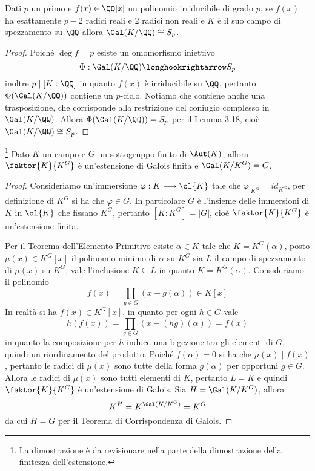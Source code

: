 \documentclass[11pt]{scrartcl}
\begin{document}
	\begin{lemma}
		\label{lemma3.19}
		Dati $p$ un primo e $f(x) \in \QQ[x]$ un polinomio irriducibile di grado
		$p$, se $f(x)$ ha esattamente $p - 2$ radici reali e 2 radici non reali
		e $K$ è il suo campo di spezzamento su $\QQ$ allora $\Gal(K/\QQ) \cong S_p$.
	\end{lemma}
	
	\begin{proof}
		Poiché $\deg f = p$ esiste un omomorfismo iniettivo 
		\[
		\Phi: \Gal(K/\QQ) \longhookrightarrow S_p
		\]
		inoltre $p \mid [K:\QQ]$ in quanto $f(x)$ è irriducibile su $\QQ$, pertanto 
		$\Phi(\Gal(K/\QQ))$ contiene un $p$-ciclo. Notiamo che contiene anche una
		trasposizione, che corrisponde alla restrizione del coniugio complesso 
		in $\Gal(K/\QQ)$. Allora $\Phi(\Gal(K/\QQ)) = S_p$ per il 
		\hyperref[lemma3.18]{Lemma 3.18}, cioè $\Gal(K/\QQ) \cong S_p$.
	\end{proof}
	
	\begin{lemma}
		\footnote{
			La dimostrazione è da revisionare nella parte della dimostrazione 
			della finitezza dell'estensione.
		}
		\label{lemma3.20}
		Dato $K$ un campo e $G$ un sottogruppo finito di $\Aut(K)$, allora 
		$\faktor{K}{K^G}$ è un'estensione di Galois finita e $\Gal(K/K^G) = G$.
	\end{lemma}
	
	\begin{proof}
		Consideriamo un'immersione $\varphi: K \longrightarrow \ol{K}$ tale che
		$\varphi_{\mid K^G} = id_{K^G}$, per definizione di $K^G$ si ha che 
		$\varphi \in G$. In particolare $G$ è l'insieme delle immersioni di $K$
		in $\ol{K}$ che fissano $K^G$, pertanto $[K:K^G] = |G|$, cioè $\faktor{K}{K^G}$
		è un'estensione finita. 
		
		Per il Teorema dell'Elemento Primitivo esiste $\alpha \in K$ tale che 
		$K = K^G(\alpha)$, posto $\mu(x) \in K^G[x]$ il polinomio minimo di $\alpha$
		su $K^G$ sia $L$ il campo di spezzamento di $\mu(x)$ su $K^G$, vale
		l'inclusione $K \subseteq L$ in quanto $K = K^G(\alpha)$. Consideriamo 
		il polinomio 
		\[
		f(x) = \prod_{g \in G}(x - g(\alpha)) \in K[x]
		\]
		In realtà si ha $f(x) \in K^G[x]$, in quanto per ogni $h \in G$ vale 
		\[
		h(f(x)) = \prod_{g \in G}(x - (hg)(\alpha)) = f(x)
		\]
		in quanto la composizione per $h$ induce una bigezione tra gli elementi di $G$,
		quindi un riordinamento del prodotto. Poiché $f(\alpha) = 0$ si ha che
		$\mu(x)\mid f(x)$, pertanto le radici di $\mu(x)$ sono tutte della forma
		$g(\alpha)$ per opportuni $g \in G$. Allora le radici di $\mu(x)$ sono
		tutti elementi di $K$, pertanto $L = K$ e quindi $\faktor{K}{K^G}$ è 
		un'estensione di Galois. Sia $H = \Gal(K/K^G)$, allora
		\[
		K^H = K^{\Gal(K/K^G)} = K^G
		\]
		da cui $H = G$ per il Teorema di Corrispondenza di Galois.
	\end{proof}
	
\end{document}
